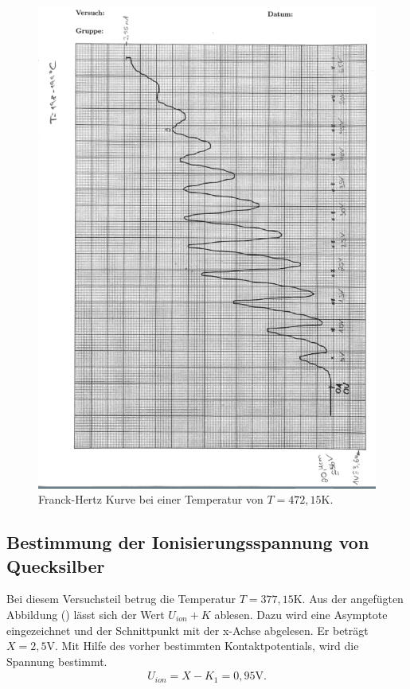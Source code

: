 \begin{figure}[H]
  \centering
  \includegraphics{FranckHertz.PNG}
  \caption{Franck-Hertz Kurve bei einer Temperatur von $T=472,15 \si{\K}$.}
  \label{fig:plot}
\end{figure}


\subsection{Bestimmung der Ionisierungsspannung von Quecksilber}
Bei diesem Versuchsteil betrug die Temperatur $T= 377,15\si{\K}$.
Aus der angefügten Abbildung () lässt sich der Wert $U_{ion}+K$ ablesen.
Dazu wird eine Asymptote eingezeichnet und der Schnittpunkt mit der x-Achse abgelesen.
Er beträgt $X = 2,5 \si{\V}$. Mit Hilfe des vorher bestimmten Kontaktpotentials, wird die Spannung bestimmt.
\begin{align*}
U_{ion} = X-K_1 = 0,95\si{\V}.
\end{align*}

